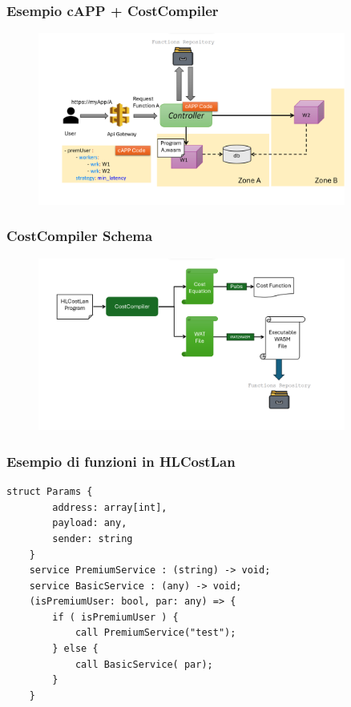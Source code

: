 \documentclass[xcolor=dvipsnames]{beamer}
\begin{document}
\begin{frame}
    \frametitle{Esempio cAPP + CostCompiler}
    \begin{figure}
        \centering
        \includegraphics[width=0.9\textwidth]{capp_schema_worker_sel.png}
    \end{figure}
\end{frame}
\begin{frame}
    \frametitle{CostCompiler Schema}
    \begin{figure}
        \centering
        \includegraphics[width=0.9\textwidth]{cost_compiler_schema.png}
    \end{figure}
\end{frame}
\begin{frame}[fragile]
    \frametitle{Esempio di funzioni in HLCostLan}
    \begin{lstlisting}[language=HLCostLan, caption={Listing8}]
    struct Params {
        address: array[int],
        payload: any,
        sender: string
    }
    service PremiumService : (string) -> void;
    service BasicService : (any) -> void;
    (isPremiumUser: bool, par: any) => {
        if ( isPremiumUser ) {
            call PremiumService("test");
        } else {
            call BasicService( par);
        }
    }
    \end{lstlisting}
\end{frame}
\end{document}
